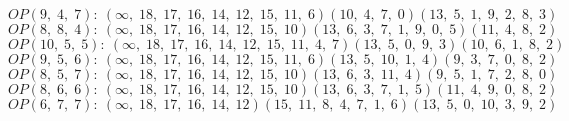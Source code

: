 $OP(9, \;4, \;7): \:(\infty, \;18, \;17, \;16, \;14, \;12, \;15, \;11, \;6)(10, \;4, \;7, \;0)(13, \;5, \;1, \;9, \;2, \;8, \;3)$\\
$OP(8, \;8, \;4): \:(\infty, \;18, \;17, \;16, \;14, \;12, \;15, \;10)(13, \;6, \;3, \;7, \;1, \;9, \;0, \;5)(11, \;4, \;8, \;2)$\\
$OP(10, \;5, \;5): \:(\infty, \;18, \;17, \;16, \;14, \;12, \;15, \;11, \;4, \;7)(13, \;5, \;0, \;9, \;3)(10, \;6, \;1, \;8, \;2)$\\
$OP(9, \;5, \;6): \:(\infty, \;18, \;17, \;16, \;14, \;12, \;15, \;11, \;6)(13, \;5, \;10, \;1, \;4)(9, \;3, \;7, \;0, \;8, \;2)$\\
$OP(8, \;5, \;7): \:(\infty, \;18, \;17, \;16, \;14, \;12, \;15, \;10)(13, \;6, \;3, \;11, \;4)(9, \;5, \;1, \;7, \;2, \;8, \;0)$\\
$OP(8, \;6, \;6): \:(\infty, \;18, \;17, \;16, \;14, \;12, \;15, \;10)(13, \;6, \;3, \;7, \;1, \;5)(11, \;4, \;9, \;0, \;8, \;2)$\\
$OP(6, \;7, \;7): \:(\infty, \;18, \;17, \;16, \;14, \;12)(15, \;11, \;8, \;4, \;7, \;1, \;6)(13, \;5, \;0, \;10, \;3, \;9, \;2)$\\

